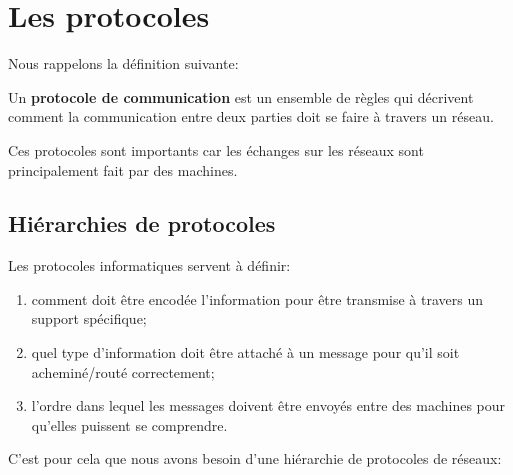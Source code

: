 \documentclass[11pt, a4paper]{book}
\begin{document}
\begin{exercice}
\begin{center}

\end{center}

\end{exercice}



\section{Les protocoles}

Nous rappelons la définition suivante:

\begin{defi}
Un {\bf protocole de communication} est un ensemble de règles qui décrivent comment la communication entre deux parties doit se faire à travers un réseau.

\end{defi}

Ces protocoles sont importants car les échanges sur les réseaux sont principalement fait par des machines.

\subsection{Hiérarchies de protocoles}

Les protocoles informatiques servent à définir:
\begin{enumerate}
\item comment doit être encodée l'information pour être transmise à travers un support spécifique;
\item quel type d'information doit être attaché à un message pour qu'il soit acheminé/routé correctement;
\item l'ordre dans lequel les messages doivent être envoyés entre des machines pour qu'elles puissent se comprendre.

\end{enumerate}

C'est pour cela que nous avons besoin d'une hiérarchie de protocoles de réseaux:
\end{document}
